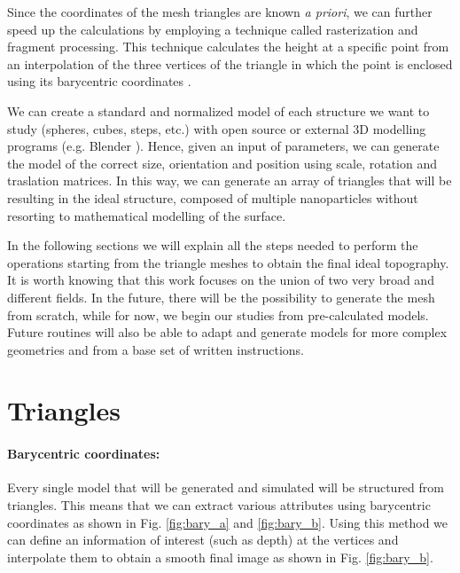 \vspace{10pt}

Since the coordinates of the mesh triangles are known \textit{a priori}, we can further speed up the calculations by employing a technique called rasterization and fragment processing. This technique calculates the height at a specific point from an interpolation of the three vertices of the triangle in which the point is enclosed using its barycentric coordinates \cite{rasterization}.

\vspace{10pt}

We can create a standard and normalized model of each structure we want to study (spheres, cubes, steps, etc.) with open source or external 3D modelling programs (e.g. Blender \cite{blender}). Hence, given an input of parameters, we can generate the model of the correct size, orientation and position using scale, rotation and traslation matrices. In this way, we can generate an array of triangles that will be resulting in the ideal structure, composed of multiple nanoparticles without resorting to mathematical modelling of the surface.

\vspace{10pt}

In the following sections we will explain all the steps needed to perform the operations starting from the triangle meshes to obtain the final ideal topography.
It is worth knowing that this work focuses on the union of two very broad and different fields. In the future, there will be the possibility to generate the mesh from scratch, while for now, we begin our studies from pre-calculated models. Future routines will also be able to adapt and generate models for more complex geometries and from a base set of written instructions.

\newpage

\section{Triangles}

\paragraph{Barycentric coordinates: }

Every single model that will be generated and simulated will be structured from triangles. This means that we can extract various attributes using barycentric coordinates as shown in Fig. \ref{fig:bary_a} and \ref{fig:bary_b}. Using this method we can define an information of interest (such as depth) at the vertices and interpolate them to obtain a smooth final image as shown in Fig. \ref{fig:bary_b}.


